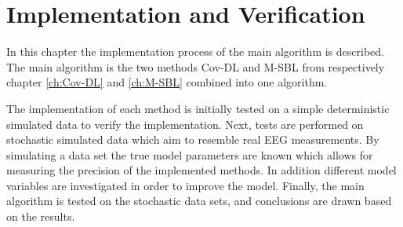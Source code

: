 \chapter{Implementation and Verification}\label{ch:implementation}
In this chapter the implementation process of the main algorithm is described. 
The main algorithm is the two methods Cov-DL and M-SBL from respectively chapter \ref{ch:Cov-DL} and \ref{ch:M-SBL} combined into one algorithm.

The implementation of each method is initially tested on a simple deterministic simulated data to verify the implementation. 
Next, tests are performed on stochastic simulated data which aim to resemble real EEG measurements. 
By simulating a data set the true model parameters are known which allows for measuring the precision of the implemented methods. 
In addition different model variables are investigated in order to improve the model.
Finally, the main algorithm is tested on the stochastic data sets, and conclusions are drawn based on the results.  






   






